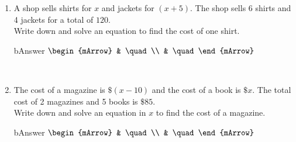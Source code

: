 \begin{enumerate}[resume]	
  \item \begin{exercise} A shop sells shirts for $x$ and jackets for $(x + 5)$. The shop sells 6 shirts and 4 jackets for a total of $120$.\\
                         Write down and solve an equation to find the cost of one shirt.
           \begin{envOut}[height=6cm]{bAnswer}
		      $\begin{mArrow}
		            &  \quad                       \\ 
                    &  \quad      						  
	           \end{mArrow}$
           \end{envOut}			  
	       \begin{shortsolution}  
	            $\quad$
           \end{shortsolution}
	  \end{exercise}


  \item \begin{exercise} The cost of a magazine is $\$(x-10)$ and the cost of a book is $\$x$. The total cost of 2 magazines and 5 books is $\$85$.\\
                         Write down and solve an equation in $x$ to find the cost of a magazine.
           \begin{envOut}[height=6cm]{bAnswer}
		      $\begin{mArrow}
		            &  \quad                       \\ 
                    &  \quad      						  
	           \end{mArrow}$
           \end{envOut}			  
	       \begin{shortsolution}  
	            $\quad$
           \end{shortsolution}
	  \end{exercise}
\end{enumerate}	  

